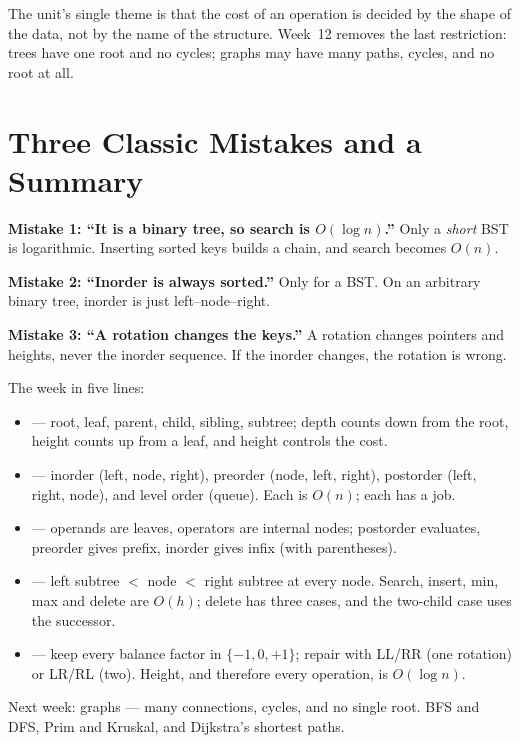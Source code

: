 \documentclass[11pt]{article}
\theoremstyle{definition}
\begin{document}
The unit's single theme is that the cost of an operation is decided by the
shape of the data, not by the name of the structure. Week~12 removes the last
restriction: trees have one root and no cycles; graphs may have many paths,
cycles, and no root at all.

\section{Three Classic Mistakes and a Summary}

\textbf{Mistake 1: ``It is a binary tree, so search is $O(\log n)$.''} Only a
\emph{short} BST is logarithmic. Inserting sorted keys builds a chain, and
search becomes $O(n)$.

\textbf{Mistake 2: ``Inorder is always sorted.''} Only for a BST. On an
arbitrary binary tree, inorder is just left--node--right.

\textbf{Mistake 3: ``A rotation changes the keys.''} A rotation changes
pointers and heights, never the inorder sequence. If the inorder changes, the
rotation is wrong.

The week in five lines:

\begin{itemize}
  \item {} --- root, leaf, parent, child, sibling, subtree;
    depth counts down from the root, height counts up from a leaf, and height
    controls the cost.
  \item {} --- inorder (left, node, right), preorder (node,
    left, right), postorder (left, right, node), and level order (queue).
    Each is $O(n)$; each has a job.
  \item {} --- operands are leaves, operators are
    internal nodes; postorder evaluates, preorder gives prefix, inorder gives
    infix (with parentheses).
  \item {} --- left subtree $<$ node $<$ right subtree at every node.
    Search, insert, min, max and delete are $O(h)$; delete has three cases,
    and the two-child case uses the successor.
  \item {} --- keep every balance factor in $\{-1,0,+1\}$; repair with
    LL/RR (one rotation) or LR/RL (two). Height, and therefore every
    operation, is $O(\log n)$.
\end{itemize}

Next week: graphs --- many connections, cycles, and no single root. BFS and
DFS, Prim and Kruskal, and Dijkstra's shortest paths.
\end{document}
